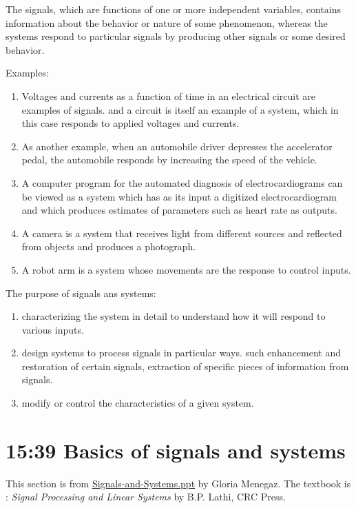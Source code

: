 \documentclass[koma,utopia,letterpaper,captions=tableheading,11pt,listings-sv,microtype,paralist,colorlinks=true,urlcolor=blue]{org-article}
\begin{document}
The signals, which are functions of one or more independent variables, contains
information about the behavior or nature of some phenomenon, whereas the systems
respond to particular signals by producing other signals or some desired
behavior.

Examples:
\begin{enumerate}
\item Voltages and currents as a function of time in an electrical circuit are
examples of signals. and a circuit is itself an example of a system, which in
this case responds to applied voltages and currents.
\item As another example, when an automobile driver depresses the accelerator
pedal, the automobile responds by increasing the speed of the vehicle.
\item A computer program for the automated diagnosis of electrocardiograms can be
viewed as a system which has as its input a digitized electrocardiogram and
which produces estimates of parameters such as heart rate as outputs.
\item A camera is a system that receives light from different sources and reflected
from objects and produces a photograph.
\item A robot arm is a system whose movements are the response to control inputs.
\end{enumerate}


The purpose of signals ans systems:
\begin{enumerate}
\item characterizing the system in detail to understand how it will respond to
various inputs.
\item design systems to process signals in particular ways. such enhancement and
restoration of certain signals, extraction of specific pieces of information
from signals.
\item modify or control the characteristics of a given system.
\end{enumerate}


\section{15:39 Basics of signals and systems}
\label{sec:org023432e}


This section is from \href{http://www.di.univr.it/documenti/OccorrenzaIns/matdid/matdid744681.pdf}{Signals-and-Systems.ppt}  by Gloria Menegaz. The textbook
is : \emph{Signal Processing and Linear Systems} by B.P. Lathi, CRC Press.
\end{document}
